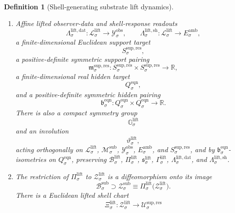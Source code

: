 \documentclass[11pt]{article}
\newcommand{\DataSpace}[1]{\mathcal Y_{#1}^{\mathrm{obs}}}
\newcommand{\AmbientTarget}[1]{E_{#1}^{\mathrm{amb}}}
\newcommand{\EqnTarget}[1]{Q_{#1}^{\mathrm{eqn}}}
\newcommand{\EqnPair}[1]{\mathfrak b_{#1}^{\mathrm{eqn}}}
\newcommand{\ResSpace}[1]{\mathcal U_{#1}^{\mathrm{sup,res}}}
\newcommand{\ResTarget}[1]{S_{#1}^{\mathrm{sup,res}}}
\newcommand{\ResPair}[1]{\mathfrak m_{#1}^{\mathrm{sup,res}}}
\newcommand{\SubSpace}[1]{\mathcal M_{#1}^{\mathrm{sub}}}
\newcommand{\SubBody}[1]{\mathcal B_{#1}^{\mathrm{sub}}}
\newcommand{\SubShellSet}[1]{\mathcal Z_{#1}^{\mathrm{sub}}}
\newcommand{\LiftSpace}[1]{\mathcal L_{#1}^{\mathrm{lift}}}
\newcommand{\LiftBody}[1]{\mathcal B_{#1}^{\mathrm{lift}}}
\newcommand{\LiftProj}[1]{\Pi_{#1}^{\mathrm{lift}}}
\newcommand{\LiftSelect}[1]{\mathfrak s_{#1}^{\mathrm{lift}}}
\newcommand{\LiftSection}[1]{\Gamma_{#1}^{\mathrm{lift}}}
\newcommand{\LiftFunctional}[1]{\mathscr V_{#1}^{\mathrm{lift}}}
\newcommand{\LiftData}[1]{\Lambda_{#1}^{\mathrm{lift,dat}}}
\newcommand{\LiftShellMap}[1]{\Lambda_{#1}^{\mathrm{lift,sh}}}
\newcommand{\LiftSym}[1]{\mathbb G_{#1}^{\mathrm{lift}}}
\newcommand{\LiftTime}[1]{\vartheta_{#1}^{\mathrm{lift}}}
\newcommand{\LiftShellSet}[1]{\mathcal Z_{#1}^{\mathrm{lift}}}
\newcommand{\LiftChart}[1]{\Xi_{#1}^{\mathrm{lift}}}
\newtheorem{definition}{Definition}
\begin{document}
\begin{definition}[Shell-generating substrate lift dynamics]
\begin{enumerate}
\[    \]
    and that there exists \(\mu_{\sigma}^{\mathrm{fib}}>0\) such that
    \begin{equation}
    \LiftFunctional{\sigma}(\ell)
    \ge
    \LiftFunctional{\sigma}\bigl(\LiftSelect{\sigma}(m)\bigr)
    +
    \mu_{\sigma}^{\mathrm{fib}}\,
    \operatorname{dist}\bigl(\ell,\LiftSelect{\sigma}(m)\bigr)^{2}
    \label{eq:fibergap}
    \end{equation}
    for every \(m\in\SubBody{\sigma}\) and every \(\ell\in\bigl(\LiftProj{\sigma}\bigr)^{-1}(m)\cap\LiftBody{\sigma}\). Assume there exists \(\mu_{\sigma}^{\mathrm{sub}}>0\) such that
    \begin{equation}
    \LiftFunctional{\sigma}\bigl(\LiftSelect{\sigma}(m)\bigr)
    \ge
    \mu_{\sigma}^{\mathrm{sub}}\,
    \operatorname{dist}\bigl(m,\LiftProj{\sigma}(\LiftShellSet{\sigma})\bigr)^{2}
    \qquad
    \text{for all }m\in\SubBody{\sigma}.
    \label{eq:projectedgap}
    \end{equation}
    \item Affine lifted observer-data and shell-response readouts
    \[
    \LiftData{\sigma}:\LiftSpace{\sigma}\to\DataSpace{\sigma},
    \qquad
    \LiftShellMap{\sigma}:\LiftSpace{\sigma}\to\AmbientTarget{\sigma},
    \]
    a finite-dimensional Euclidean support target
    \[
    \ResTarget{\sigma},
    \]
    a positive-definite symmetric support pairing
    \[
    \ResPair{\sigma}:
    \ResTarget{\sigma}\times\ResTarget{\sigma}\to\mathbb R,
    \]
    a finite-dimensional real hidden target
    \[
    \EqnTarget{\sigma},
    \]
    and a positive-definite symmetric hidden pairing
    \[
    \EqnPair{\sigma}:
    \EqnTarget{\sigma}\times\EqnTarget{\sigma}\to\mathbb R.
    \]
    There is also a compact symmetry group
    \[
    \LiftSym{\sigma}
    \]
    and an involution
    \[
    \LiftTime{\sigma},
    \]
    acting orthogonally on \(\LiftSpace{\sigma}\), \(\SubSpace{\sigma}\), \(\DataSpace{\sigma}\), \(\AmbientTarget{\sigma}\), and \(\ResTarget{\sigma}\), and by \(\EqnPair{\sigma}\)-isometries on \(\EqnTarget{\sigma}\), preserving \(\LiftBody{\sigma}\), \(\LiftProj{\sigma}\), \(\LiftSelect{\sigma}\), \(\LiftSection{\sigma}\), \(\LiftData{\sigma}\), and \(\LiftShellMap{\sigma}\).
    \item The restriction of \(\LiftProj{\sigma}\) to \(\LiftShellSet{\sigma}\) is a diffeomorphism onto its image
    \[
    \SubBody{\sigma}
    \supset
    \SubShellSet{\sigma}
    \equiv
    \LiftProj{\sigma}\bigl(\LiftShellSet{\sigma}\bigr).
    \]
    There is a Euclidean lifted shell chart
    \[
    \LiftChart{\sigma}:\LiftShellSet{\sigma}\to\ResSpace{\sigma}
\]
\end{enumerate}
\end{definition}
\end{document}

